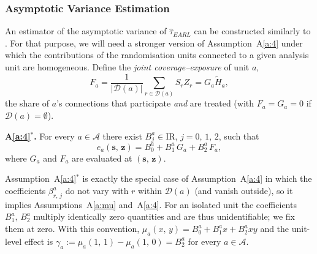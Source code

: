 \documentclass[sigconf]{acmart}
\newcounter{assumption}
\newenvironment{assumptionstar}[1]{\par\medskip\noindent\textbf{#1.}\enspace}{\par\medskip}
\newcommand{\R}{\mathrm{I}\!\mathrm{R}}
\begin{document}
\subsubsection{Asymptotic Variance Estimation}\label{subsubsec:variance}
An estimator of the asymptotic variance of $\hat\tau^{\phantom{1}}_{EARL}$ can be constructed similarly to \cite[Section 5.1]{harshaw2023erl}. For that purpose, we will need a stronger version of Assumption~A\ref{a:4} under which the contributions of the randomisation units connected to a given analysis unit are homogeneous. Define the \emph{joint coverage--exposure} of unit $a$,
\begin{equation}\label{eq:Fa}
    F_a = \frac{1}{|\mathcal{D}(a)|}\sum_{r\in\mathcal{D}(a)} S_rZ_r = G_a\tilde H_a,
\end{equation}
the share of $a$'s connections that participate \emph{and} are treated (with $F_a=G_a=0$ if $\mathcal D(a)=\emptyset$).

\begin{assumptionstar}{A\ref{a:4}$^*$}
For every $a\in\mathcal A$ there exist $B^a_j\in\R$, $j=0,\,1,\,2$, such that
\begin{equation*}
    e_a(\mathbf s,\,\mathbf z) = B^a_0 + B^a_1 \, G_a + B^a_2 \, F_a ,
\end{equation*}
where $G_a$ and $F_a$ are evaluated at $(\mathbf s,\,\mathbf z)$.
\end{assumptionstar}

Assumption~A\ref{a:4}$^*$ is exactly the special case of Assumption~A\ref{a:4} in which the coefficients $\beta^a_{r,\,j}$ do not vary with $r$ within $\mathcal D(a)$ (and vanish outside), so it implies Assumptions~A\ref{a:mu} and~A\ref{a:4}. For an isolated unit the coefficients $B_1^a,\,B_2^a$ multiply identically zero quantities and are thus unidentifiable; we fix them at zero. With this convention, $\mu_a(x,\,y) = B_0^a + B_1^ax + B_2^axy$ and the unit-level effect is $\gamma_a := \mu_a(1,\,1)-\mu_a(1,\,0) = B_2^a$ for every $a\in\mathcal A$.
\end{document}
